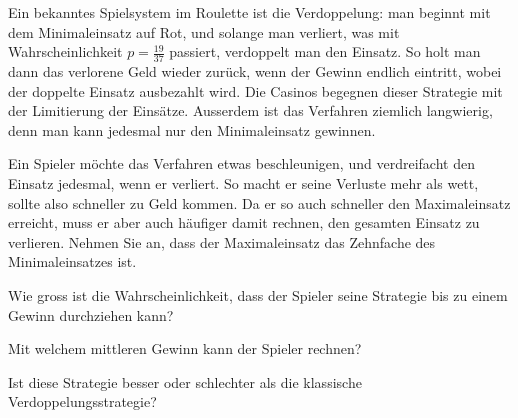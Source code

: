 Ein bekanntes Spielsystem im Roulette ist die Verdoppelung: man beginnt
mit dem Minimaleinsatz auf Rot, und solange man verliert,
was mit Wahrscheinlichkeit $p=\frac{19}{37}$ passiert,
verdoppelt man den Einsatz.
So holt man dann das verlorene Geld wieder zurück,
wenn der Gewinn endlich eintritt, wobei der
doppelte Einsatz ausbezahlt wird.
Die Casinos begegnen dieser Strategie mit der Limitierung der Einsätze.
Ausserdem ist das Verfahren ziemlich langwierig,
denn man kann jedesmal nur den Minimaleinsatz gewinnen.

Ein Spieler möchte das Verfahren etwas beschleunigen, und verdreifacht
den Einsatz jedesmal, wenn er verliert. So macht er seine Verluste mehr
als wett, sollte also schneller zu Geld kommen. Da er so auch schneller
den Maximaleinsatz erreicht, muss er aber auch häufiger damit rechnen,
den gesamten Einsatz zu verlieren.
Nehmen Sie an, dass der Maximaleinsatz das Zehnfache des Minimaleinsatzes ist.
\begin{teilaufgaben}
\item
Wie gross ist die Wahrscheinlichkeit, dass der Spieler seine Strategie
bis zu einem Gewinn durchziehen kann?
\item
Mit welchem mittleren Gewinn kann der Spieler rechnen?
\item
Ist diese Strategie besser oder schlechter als die klassische
Verdoppelungsstrategie?
\end{teilaufgaben}


